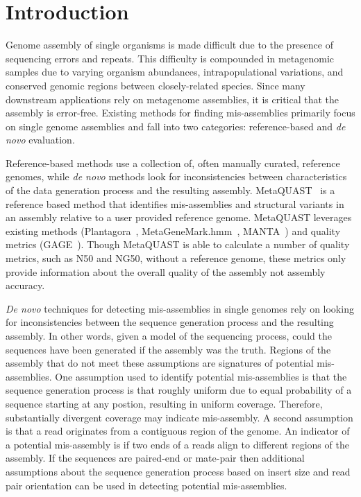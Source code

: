 \documentclass{bioinfo}
\begin{document}
\section{Introduction}

Genome assembly of single organisms is made difficult due to the presence of sequencing errors and repeats.
This difficulty is compounded in metagenomic samples due to varying organism abundances, intrapopulational variations, and conserved genomic regions between closely-related species.
Since many downstream applications rely on metagenome assemblies, it is critical that the assembly is error-free.
Existing methods for finding mis-assemblies primarily focus on single genome assemblies and fall into two categories: reference-based and \emph{de novo} evaluation.

Reference-based methods use a collection of, often manually curated, reference genomes, while \emph{de novo} methods look for inconsistencies between characteristics of the data generation process and the resulting assembly. 
MetaQUAST~\citep{mikheenko2015metaquast} is a reference based method that identifies mis-assemblies and structural variants in an assembly relative to a user provided reference genome.
MetaQUAST leverages existing methods (Plantagora~\citep{barthelson2011plantagora},
MetaGeneMark.hmm~\citep{zhu2010ab}, MANTA~\citep{chen2015manta}) and quality metrics (GAGE~\citep{salzberg2011gage}). 
Though MetaQUAST is able to calculate a number of quality metrics, such as N50 and NG50, without a reference genome, these metrics only provide information about the overall quality of the assembly not assembly accuracy.

\emph{De novo} techniques for detecting mis-assemblies in single genomes rely on looking for inconsistencies between the sequence generation process and the resulting assembly.
In other words, given a model of the sequencing process, could the sequences have been generated if the assembly was the truth.
Regions of the assembly that do not meet these assumptions are signatures of potential mis-assemblies.
One assumption used to identify potential mis-assemblies is that the sequence generation process is that roughly uniform due to equal probability of a sequence starting at any postion, resulting in uniform coverage.
Therefore, substantially divergent coverage may indicate mis-assembly.
A second assumption is that a read originates from a contiguous region of the genome.  An indicator of a potential mis-assembly is if two ends of a reads align to different regions of the assembly.
If the sequences are paired-end or mate-pair then additional assumptions about the sequence generation process based on insert size and read pair orientation can be used in detecting potential mis-assemblies.
\end{document}

